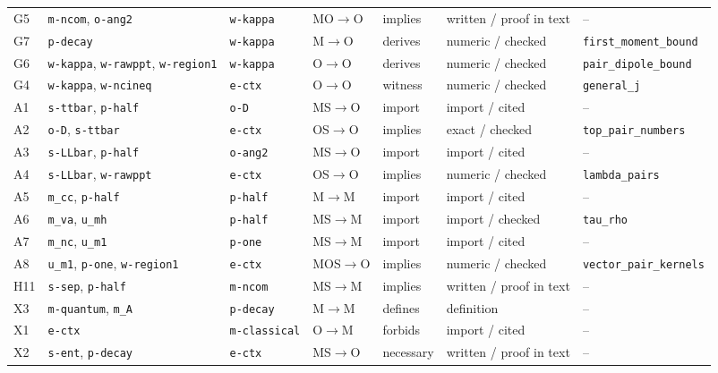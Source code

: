 \begin{ruledtabular}
\begin{tabular}{lllllll}
G5 & \texttt{m-ncom}, \texttt{o-ang2} & \texttt{w-kappa} & MO$\to$O & implies & written / proof in text & -- \\
G7 & \texttt{p-decay} & \texttt{w-kappa} & M$\to$O & derives & numeric / checked & \texttt{first\_moment\_bound} \\
G6 & \texttt{w-kappa}, \texttt{w-rawppt}, \texttt{w-region1} & \texttt{w-kappa} & O$\to$O & derives & numeric / checked & \texttt{pair\_dipole\_bound} \\
G4 & \texttt{w-kappa}, \texttt{w-ncineq} & \texttt{e-ctx} & O$\to$O & witness & numeric / checked & \texttt{general\_j} \\
A1 & \texttt{s-ttbar}, \texttt{p-half} & \texttt{o-D} & MS$\to$O & import & import / cited & -- \\
A2 & \texttt{o-D}, \texttt{s-ttbar} & \texttt{e-ctx} & OS$\to$O & implies & exact / checked & \texttt{top\_pair\_numbers} \\
A3 & \texttt{s-LLbar}, \texttt{p-half} & \texttt{o-ang2} & MS$\to$O & import & import / cited & -- \\
A4 & \texttt{s-LLbar}, \texttt{w-rawppt} & \texttt{e-ctx} & OS$\to$O & implies & numeric / checked & \texttt{lambda\_pairs} \\
A5 & \texttt{m\_cc}, \texttt{p-half} & \texttt{p-half} & M$\to$M & import & import / cited & -- \\
A6 & \texttt{m\_va}, \texttt{u\_mh} & \texttt{p-half} & MS$\to$M & import & import / checked & \texttt{tau\_rho} \\
A7 & \texttt{m\_nc}, \texttt{u\_m1} & \texttt{p-one} & MS$\to$M & import & import / cited & -- \\
A8 & \texttt{u\_m1}, \texttt{p-one}, \texttt{w-region1} & \texttt{e-ctx} & MOS$\to$O & implies & numeric / checked & \texttt{vector\_pair\_kernels} \\
H11 & \texttt{s-sep}, \texttt{p-half} & \texttt{m-ncom} & MS$\to$M & implies & written / proof in text & -- \\
X3 & \texttt{m-quantum}, \texttt{m\_A} & \texttt{p-decay} & M$\to$M & defines & definition & -- \\
X1 & \texttt{e-ctx} & \texttt{m-classical} & O$\to$M & forbids & import / cited & -- \\
X2 & \texttt{s-ent}, \texttt{p-decay} & \texttt{e-ctx} & MS$\to$O & necessary & written / proof in text & -- \\
\end{tabular}
\end{ruledtabular}
